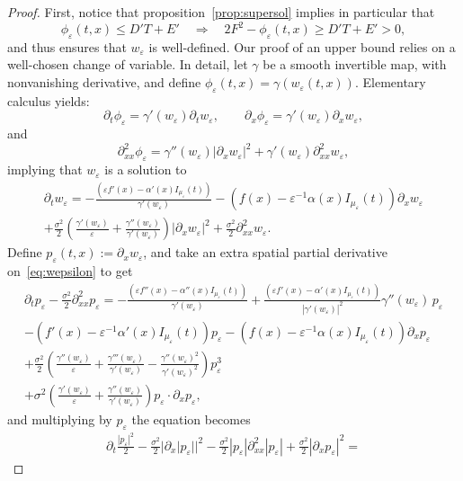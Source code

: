 \documentclass[10pt,a4paper]{amsart}
\newcommand{\eps}{\varepsilon}
\begin{document}
\begin{proof}
First, notice that proposition~\ref{prop:supersol} implies in particular that
$$
\phi_\eps(t,x)\leq D'T+E'\quad\Rightarrow\quad 2F^2-\phi_\eps(t,x)\geq D'T+E'>0,
$$
and thus ensures that $w_\eps$ is well-defined. Our proof of an upper bound relies on a well-chosen change of variable. In detail, let $\gamma$ be a smooth invertible map, with nonvanishing derivative, and define $\phi_\eps(t,x)=\gamma(w_\eps(t,x))$. Elementary calculus yields:
$$
\partial_t\phi_\eps = \gamma'(w_\eps)\partial_tw_\eps,\qquad \partial_x\phi_\eps = \gamma'(w_\eps)\partial_xw_\eps,
$$
and
$$
\partial^2_{xx}\phi_\eps=\gamma''(w_\eps)|\partial_xw_\eps|^2+\gamma'(w_\eps)\partial^2_{xx}w_\eps,
$$
implying that $w_\eps$ is a solution to
\begin{multline}
\partial_tw_\eps = -\frac{\left(\eps f'(x) - \alpha'(x)I_{\mu_\eps}(t) \right)}{\gamma'(w_\eps)}-  \left( f(x)- \eps^{-1}\alpha(x) I_{\mu_\eps}(t)\right)\partial_xw_\eps
\\
 + \frac{\sigma^2}{2}\left(\frac{\gamma'(w_\eps)}{\eps}+\frac{\gamma''(w_\eps)}{\gamma'(w_\eps)}\right) \vert \partial_x w_\eps \vert^2  + \frac {\sigma^2}{2} \partial_{xx}^2 w_\eps.
\label{eq:wepsilon}
\end{multline}
Define $p_\eps(t,x):=\partial_xw_\eps$, and take an extra spatial partial derivative on~\eqref{eq:wepsilon} to get
\begin{multline*}
\partial_tp_\eps- \frac {\sigma^2}{2} \partial_{xx}^2 p_\eps = -\frac{\left(\eps f''(x) - \alpha''(x)I_{\mu_\eps}(t) \right)}{\gamma'(w_\eps)}+\frac{\left(\eps f'(x) - \alpha'(x)I_{\mu_\eps}(t) \right)}{|\gamma'(w_\eps)|^2}\gamma''(w_\eps)\,p_\eps
\\
-  \left( f'(x)- \eps^{-1}\alpha'(x) I_{\mu_\eps}(t)\right)p_\eps-  \left( f(x)- \eps^{-1}\alpha(x) I_{\mu_\eps}(t)\right)\partial_xp_\eps
\\
 + \frac{\sigma^2}{2}\left(\frac{\gamma''(w_\eps)}{\eps}+\frac{\gamma'''(w_\eps)}{\gamma'(w_\eps)}-\frac{\gamma''(w_\eps)^2}{\gamma'(w_\eps)^2}\right)  p_\eps^3
 \\ 
 + \sigma^2\left(\frac{\gamma'(w_\eps)}{\eps}+\frac{\gamma''(w_\eps)}{\gamma'(w_\eps)}\right) p_\eps \cdot\partial_x p_\eps,
\end{multline*}
and multiplying by $p_\eps$ the equation becomes
\begin{multline*}
\partial_t\frac{|p_\eps|^2}{2}-\frac{\sigma^2}{2}|\partial_x|p_\eps||^2-\frac{\sigma^2}{2}|p_\eps|\partial^2_{xx}|p_\eps|+\frac{\sigma^2}{2}|\partial_xp_\eps|^2
=

\end{multline*}
\end{proof}
\end{document}
